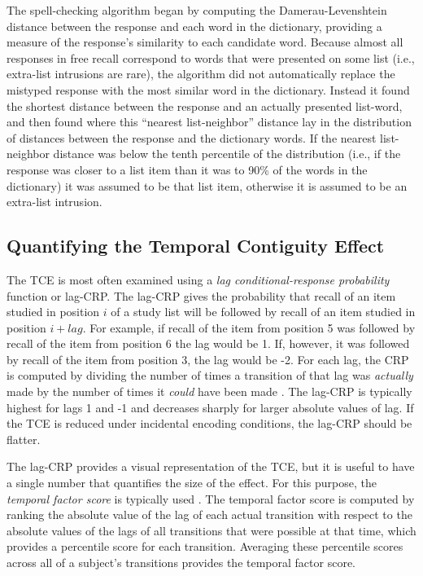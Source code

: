 \documentclass[man,natbib,floatsintext]{apa6} %
\begin{document}
The spell-checking algorithm began by computing the Damerau-Levenshtein distance \citep{Dame64} between the response and each word in the dictionary, providing a measure of the response's similarity to each candidate word. Because almost all responses in free recall correspond to words that were presented on some list (i.e., extra-list intrusions are rare), the algorithm did not automatically replace the mistyped response with the most similar word in the dictionary. Instead it found the shortest distance between the response and an actually presented list-word, and then found where this ``nearest list-neighbor'' distance lay in the distribution of distances between the response and the dictionary words. If the nearest list-neighbor distance was below the tenth percentile of the distribution (i.e., if the response was closer to a list item than it was to 90\% of the words in the dictionary) it was assumed to be that list item, otherwise it is assumed to be an extra-list intrusion.

\subsection{Quantifying the Temporal Contiguity Effect} The TCE is most often examined using a \textit{lag conditional-response probability} function or lag-CRP. The lag-CRP gives the probability that recall of an item studied in position $i$ of a study list will be followed by recall of an item studied in position $i+lag$. For example, if recall of the item from position 5 was followed by recall of the item from position 6 the lag would be 1. If, however, it was followed by recall of the item from position 3, the lag would be -2. For each lag, the CRP is computed by dividing the number of times a transition of that lag was \emph{actually} made by the number of times it \emph{could} have been made \citep[e.g., it could not have been made if the item $i+lag$ was already recalled;][]{Kaha96}. The lag-CRP is typically highest for lags 1 and -1 and decreases sharply for larger absolute values of lag. If the TCE is reduced under incidental encoding conditions, the lag-CRP should be flatter.

The lag-CRP provides a visual representation of the TCE, but it is useful to have a single number that quantifies the size of the effect. For this purpose, the \emph{temporal factor score} is typically used \citep{SedeEtal10,PolyEtal09}. The temporal factor score is computed by ranking the absolute value of the lag of each actual transition with respect to the absolute values of the lags of all transitions that were possible at that time, which provides a percentile score for each transition. Averaging these percentile scores across all of a subject's transitions provides the temporal factor score.
 
\end{document}
